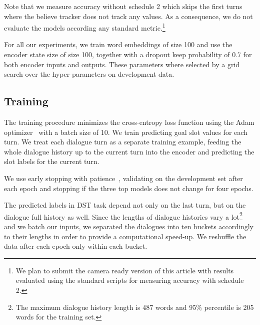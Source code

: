 \documentclass{itatnew}
\begin{document}
Note that we measure accuracy without schedule 2 which skips the first turns where the believe tracker does not track any values. As a consequence, we do not evaluate the models according any  standard metric.\footnote{We plan to submit the camera ready version of this article with results evaluated using the standard scripts for measuring accuracy with schedule 2.}


For all our experiments, we train word embeddings of size 100 and use the encoder state size of size 100, together with a dropout keep probability of $0.7$ for both encoder inputs and outputs.
These parameters where selected by a grid search over the hyper-parameters on development data.

\subsection{Training}
\label{sec:train}
The training procedure minimizes the cross-entropy loss function using the Adam optimizer~\cite{kingma2014adam} with a batch size of 10.
We train predicting goal slot values for each turn.
We treat each dialogue turn as a separate training example, feeding the whole dialogue history up to the current turn into the encoder and predicting the slot labels for the current turn.

We use early stopping with patience~\cite{prechelt1998early}, validating on the development set after each epoch and stopping if the three top models does not change for four epochs.

The predicted labels in DST task depend not only on the last turn, but on the dialogue full history as well.
Since the lengths of dialogue histories vary a lot\footnote{The maximum dialogue history length is 487 words and 95\% percentile is 205 words for the training set.} and we batch our inputs, we separated the dialogues into ten buckets accordingly to their lengths in order to provide a computational speed-up. We reshuffle the data after each epoch only within each bucket.
\end{document}

